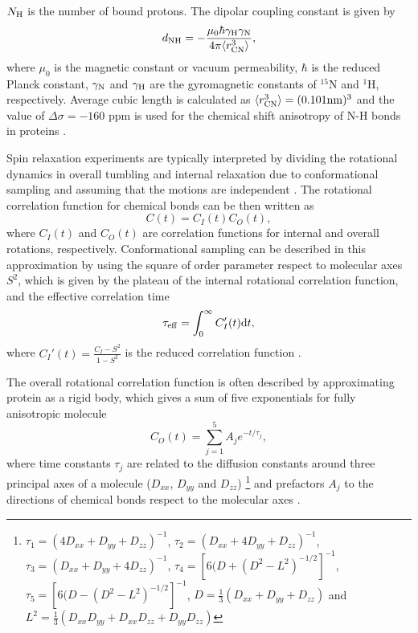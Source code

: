 \documentclass[pre,aps,floatfix,authordate1-4,twocolumn]{revtex4-1}
\begin{document}
$N_{\rm{H}}$ is the number of bound protons.
The dipolar coupling constant is given by
\begin{equation}
d_{\rm{NH}}=-\frac{\mu_0\hbar\gamma_{\rm{H}}\gamma_{\rm{N}}}{4\pi\langle r_{\rm{CN}}^3\rangle},\nonumber
\end{equation}
where $\mu_0$ is the magnetic constant or vacuum permeability, $\hbar$ is the reduced Planck constant,
$\gamma_{\rm{N}}$ and $\gamma_{\rm{H}}$ are the gyromagnetic constants of $^{15}$N and $^1$H, respectively.
Average cubic length is calculated as $\langle r_{\rm{CN}}^3\rangle = (0.101{\rm nm})^3$ and the 
value of $\Delta \sigma = -160$ ppm is used for the chemical shift anisotropy of N-H bonds in 
proteins \cite{kay89,hiyama88}.

Spin relaxation experiments are typically interpreted by
dividing the rotational dynamics in overall tumbling 
and internal relaxation due to conformational sampling 
and assuming that the motions are 
independent \cite{wennerstrom79,Lipari82,jarymowycz06,korzhnev01}.
The rotational correlation function for chemical bonds can be then written as
\begin{equation}\label{CORRFsep}
  C(t)=C_I(t)C_O(t),
\end{equation}
where $C_I(t)$ and $C_O(t)$ are correlation functions for internal and overall
rotations, respectively. Conformational sampling can be described
in this approximation by using the square of order parameter respect to 
molecular axes $S^2$, which is given by the plateau of the internal rotational 
correlation function, and the effective correlation time 
\begin{equation}
  \tau_{\rm eff}=\int_0^\infty C_I'(t) \mathrm{d}t,
\end{equation}
where $C_I'(t)=\frac{C_I-S^2}{1-S^2}$ is the reduced correlation function \cite{Lipari82}.

The overall rotational correlation function is often described
by approximating protein as a rigid body, which gives 
a sum of five exponentials for fully anisotropic molecule \cite{woessner62,korzhnev01}
\begin{equation}\label{CORRFanisot}
  C_O(t)=\sum_{j=1}^5 A_j e^{-t/\tau_j},
\end{equation}
where time constants $\tau_j$ are related 
to the diffusion constants around
three principal axes of a molecule
($D_{xx}$, $D_{yy}$ and $D_{zz}$)  
\footnote{
$\tau_1=(4D_{xx}+D_{yy}+D_{zz})^{-1}$,
$\tau_2=(D_{xx}+4D_{yy}+D_{zz})^{-1}$,
$\tau_3=(D_{xx}+D_{yy}+4D_{zz})^{-1}$,
$\tau_4=[6(D+(D^2-L^2)^{-1/2}]^{-1}$,
$\tau_5=[6(D-(D^2-L^2)^{-1/2}]^{-1}$,
$D=\frac{1}{3}(D_{xx}+D_{yy}+D_{zz})$ and 
$L^2=\frac{1}{3}(D_{xx}D_{yy}+D_{xx}D_{zz}+D_{yy}D_{zz})$}
and prefactors $A_j$ to the directions of chemical bonds 
respect to the molecular axes \cite{woessner62,luginbuhl97}.
\end{document}
